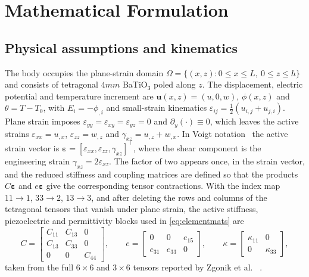 \documentclass[a4paper,12pt]{elsarticle}
\begin{document}
\section{Mathematical Formulation}
\label{sec:theory}

\subsection{Physical assumptions and kinematics}

The body occupies the plane-strain domain $\Omega=\{(x,z):0\le x\le L,\ 0\le z\le h\}$
and consists of tetragonal $4mm$ BaTiO$_3$ poled along $z$. The displacement, electric
potential and temperature increment are $\bm u(x,z)=(u,0,w)$, $\phi(x,z)$ and
$\theta=T-T_0$, with $E_i=-\phi_{,i}$ and small-strain kinematics
$\varepsilon_{ij}=\tfrac12(u_{i,j}+u_{j,i})$. Plane strain imposes
$\varepsilon_{yy}=\varepsilon_{xy}=\varepsilon_{yz}=0$ and $\partial_y(\cdot)\equiv0$,
which leaves the active strains $\varepsilon_{xx}=u_{,x}$, $\varepsilon_{zz}=w_{,z}$
and $\gamma_{xz}=u_{,z}+w_{,x}$. In Voigt notation~\cite{Nye1985,IEEE176} the active
strain vector is $\bm\varepsilon=[\varepsilon_{xx},\varepsilon_{zz},\gamma_{xz}]^\top$,
where the shear component is the engineering strain $\gamma_{xz}=2\varepsilon_{xz}$.
The factor of two appears once, in the strain vector, and the reduced stiffness and
coupling matrices are defined so that the products $C\bm\varepsilon$ and
$e\bm\varepsilon$ give the corresponding tensor contractions. With the index map
$11\to1$, $33\to2$, $13\to3$, and after deleting the rows and columns of the tetragonal
tensors that vanish under plane strain, the active stiffness, piezoelectric and
permittivity blocks used in \eqref{eq:elementmats} are
\begin{equation}
C=\begin{bmatrix}C_{11}&C_{13}&0\\C_{13}&C_{33}&0\\0&0&C_{44}\end{bmatrix},
\qquad
e=\begin{bmatrix}0&0&e_{15}\\e_{31}&e_{33}&0\end{bmatrix},
\qquad
\kappa=\begin{bmatrix}\kappa_{11}&0\\0&\kappa_{33}\end{bmatrix},
\label{eq:voigtblocks}
\end{equation}
taken from the full $6\times6$ and $3\times6$ tensors reported by Zgonik et al.
~\cite{Zgonik1994}.
\end{document}
